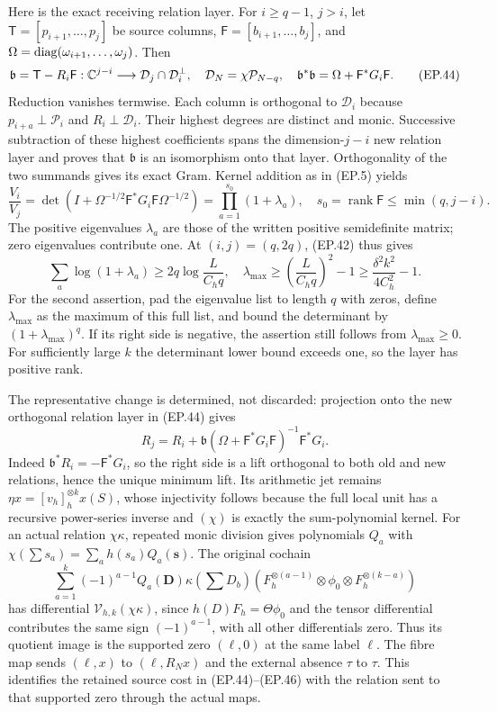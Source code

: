 Here is the exact receiving relation layer. For $i\ge q-1$, $j>i$,
let $\mathsf T=[p_{i+1},\ldots,p_j]$ be source columns,
$\mathsf F=[b_{i+1},\ldots,b_j]$, and
$\Omega=\operatorname{diag}(\omega_{i+1},\ldots,\omega_j)$. Then
\[
 \mathfrak b=\mathsf T-R_i\mathsf F:
 \mathbb C^{j-i}\longrightarrow\mathcal D_j\cap\mathcal D_i^\perp,
 \quad\mathcal D_N=\chi\mathcal P_{N-q},\quad
 \mathfrak b^*\mathfrak b=\Omega+\mathsf F^*G_i\mathsf F.
 \tag{EP.44}
\]
Reduction vanishes termwise. Each column is orthogonal to
$\mathcal D_i$ because $p_{i+a}\perp\mathcal P_i$ and
$R_i\perp\mathcal D_i$. Their highest degrees are distinct and
monic. Successive subtraction of these highest coefficients spans
the dimension-$j-i$ new relation layer and proves that $\mathfrak b$
is an isomorphism onto that layer. Orthogonality of the two summands
gives its exact Gram. Kernel addition as in (EP.5) yields
\[
 \frac{V_i}{V_j}
 =\det(I+\Omega^{-1/2}\mathsf F^*G_i\mathsf F\Omega^{-1/2})
 =\prod_{a=1}^{s_0}(1+\lambda_a),\quad
 s_0=\operatorname{rank}\mathsf F\le\min(q,j-i).
 \tag{EP.45}
\]
The positive eigenvalues $\lambda_a$ are those of the written
positive semidefinite matrix; zero eigenvalues contribute one.
At $(i,j)=(q,2q)$, (EP.42) thus gives
\[
 \sum_a\log(1+\lambda_a)\ge2q\log\frac{L}{C_hq},
 \quad
 \lambda_{\max}\ge\left(\frac{L}{C_hq}\right)^2-1
 \ge\frac{\delta^2k^2}{4C_h^2}-1.\tag{EP.46}
\]
For the second assertion, pad the eigenvalue list to length $q$
with zeros, define $\lambda_{\max}$ as the maximum of this full
list, and bound the determinant by $(1+\lambda_{\max})^q$.
If its right side is negative, the assertion still follows from
$\lambda_{\max}\ge0$. For sufficiently large $k$ the determinant
lower bound exceeds one, so the layer has positive rank.

The representative change is determined, not discarded: projection
onto the new orthogonal relation layer in (EP.44) gives
\[
 R_j=R_i+\mathfrak b(\Omega+\mathsf F^*G_i\mathsf F)^{-1}
                       \mathsf F^*G_i.\tag{EP.47}
\]
Indeed $\mathfrak b^*R_i=-\mathsf F^*G_i$, so the right side
is a lift orthogonal to both old and new relations, hence the unique
minimum lift. Its arithmetic jet remains
$\eta x=[v_h]_h^{\otimes k}x(S)$, whose injectivity follows because
the full local unit has a recursive power-series inverse and
$(\chi)$ is exactly the sum-polynomial kernel. For an actual relation
$\chi\kappa$, repeated monic division gives polynomials $Q_a$ with
$\chi(\sum s_a)=\sum_a h(s_a)Q_a(\mathbf s)$. The original cochain
\[
 \sum_{a=1}^k(-1)^{a-1}Q_a(\mathbf D)\kappa(\sum D_b)
 (F_h^{\otimes(a-1)}\otimes\phi_0\otimes F_h^{\otimes(k-a)})
 \tag{EP.48}
\]
has differential $\mathcal V_{h,k}(\chi\kappa)$, since
$h(D)F_h=\Theta\phi_0$ and the tensor differential contributes
the same sign $(-1)^{a-1}$, with all other differentials zero.
Thus its quotient image is the supported zero $(\ell,0)$ at the
same label $\ell$. The fibre map sends $(\ell,x)$ to
$(\ell,R_Nx)$ and the external absence $\tau$ to $\tau$.
This identifies the retained source cost in (EP.44)--(EP.46) with
the relation sent to that supported zero through the actual maps.

